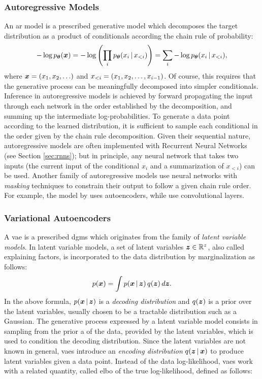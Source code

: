 \subsubsection*{Autoregressive Models}
An \gls{ar} model is a prescribed generative model which decomposes the target distribution as a product of conditionals according the chain rule of probability:
$$-\log p_{\Param}(\Vector{x}) = -\log\Par{\prod_i p_{\Param}(x_i \given x_{<i})} = \sum_i -\log p_{\Param}(x_i \given x_{<i}),$$
where $\Vector{x} = (x_1, x_2, \ldots)$ and $x_{<i} = \left( x_1, x_2, \ldots, x_{i-1} \right)$. Of course, this requires that the generative process can be meaningfully decomposed into simpler conditionals.
Inference in autoregressive models is achieved by forward propagating the input through each network in the order established by the decomposition, and summing up the intermediate log-probabilities. To generate a data point according to the learned distribution, it is sufficient to sample each conditional in the order given by the chain rule decomposition. Given their sequential nature, autoregressive models are often implemented with Recurrent Neural Networks (see Section \ref{sec:rnns}); but in principle, any neural network that takes two inputs (the current input of the conditional $x_i$ and a summarization of $x_{<i}$) can be used. Another family of autoregressive models use neural networks with \emph{masking} techniques to constrain their output to follow a given chain rule order. For example, the model by \citet{germain2015made} uses autoencoders, while \citet{vandenoord2016wavenet} use convolutional layers.

\subsubsection*{Variational Autoencoders}
A \gls{vae} \citep{kingma2014vae} is a prescribed \glspl{dgm} which originates from the family of \emph{latent variable models}. In latent variable models, a set of latent variables $\Vector{z} \in \Real^z$, also called explaining factors, is incorporated to the data distribution by marginalization as follows:
$$p(\Vector{x}) = \int p(\Vector{x} \given \Vector{z})\, q(\Vector{z})\, d\Vector{z}.$$
In the above formula, $p(\Vector{x} \given \Vector{z})$ is a \emph{decoding distribution} and $q(\Vector{z})$ is a prior over the latent variables, usually chosen to be a tractable distribution such as a Gaussian. The generative process expressed by a latent variable model consists in sampling from the prior a  of the data, provided by the latent variables, which is used to condition the decoding distribution. Since the latent variables are not known in general, \glspl{vae} introduce an \emph{encoding distribution} $q(\Vector{z} \given \Vector{x})$ to produce latent variables given a data point. Instead of the data log-likelihood, \glspl{vae} work with a related quantity, called \gls{elbo} of the true log-likelihood, defined as follows:

